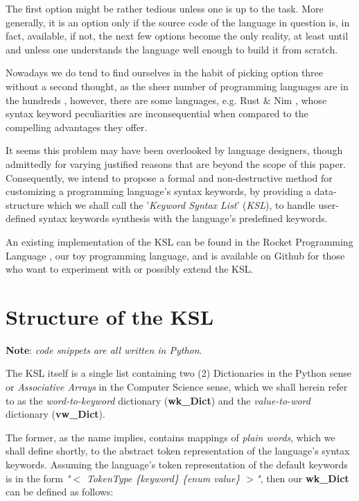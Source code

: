 \documentclass{article}
\begin{document}
\begin{multicols}{2}
The first option might be rather tedious unless one is up to the task. More generally, it is an option only if the source code of the language in question is, in fact, available, if not, the next few options become the only reality, at least until and unless one understands the language well enough to build it from scratch.

Nowadays we do tend to find ourselves in the habit of picking option three without a second thought, as the sheer number of programming languages are in the hundreds \cite{Langlst}, however, there are some languages, e.g. Rust \cite{Rust} \& Nim \cite{Nim}, whose syntax keyword peculiarities are inconsequential when compared to the compelling advantages they offer.

It seems this problem may have been overlooked by language designers, though admittedly for varying justified reasons that are beyond the scope of this paper. Consequently, we intend to propose a formal and non-destructive method for customizing a programming language's syntax keywords, by providing a data-structure which we shall call the '\textit{Keyword Syntax List}' (\textit{KSL}), to handle user-defined syntax keywords synthesis with the language's predefined keywords.

An existing implementation of the KSL can be found in the Rocket Programming Language \cite{Rocket}, our toy programming language, and is available on Github \cite{Rocket} for those who want to experiment with or possibly extend the KSL.

\end{multicols}


\section{Structure of the KSL}

\textbf{Note}: \textit{code snippets are all written in Python}.
\newline

The KSL itself is a single list containing two (2) Dictionaries in the Python sense or \textit{Associative Arrays} in the Computer Science sense, which we shall herein refer to as the \textit{word-to-keyword} dictionary (\textbf{wk\_Dict}) and the \textit{value-to-word} dictionary (\textbf{vw\_Dict}). 

The former, as the name implies, contains mappings of \textit{plain words}, which we shall define shortly, to the abstract token representation of the language's syntax keywords. Assuming the language's token representation of the default keywords is in the form \textit{"$<$ TokenType \{keyword\} \{enum value\} $>$"}, then our \textbf{wk\_Dict} can be defined as follows:
\end{document}

